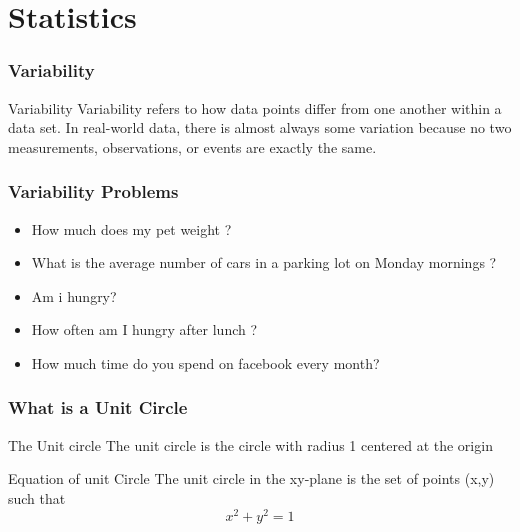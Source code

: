 \documentclass{beamer}
\begin{document}
\section{Statistics}
\begin{frame}
    \frametitle{Variability}
    \begin{block}{Variability}
        Variability refers to how data points differ from one another within a data set. In real-world data, there is almost always some variation because no two measurements, observations, or events are exactly the same.
    \end{block}
\end{frame}

\begin{frame}
    \frametitle{Variability Problems}
        \begin{itemize}
            \item How much does my pet weight ?
            \item What is the average number of cars in a parking lot on Monday mornings ?
            \item Am i hungry?
            \item How often am I hungry after lunch ? 
            \item How much time do you spend on facebook every month? 
        \end{itemize}
\end{frame}

\begin{frame}
\frametitle{What is a Unit Circle}
\begin{block}{The Unit circle}
    The unit circle is the circle with radius 1 centered at the origin 
\end{block}
\begin{block}{Equation of unit Circle}
    The unit circle in the xy-plane is the set of points (x,y) such that
    $$x^{2} + y^{2} = 1$$
    
\end{block}

\end{frame}
\end{document}
